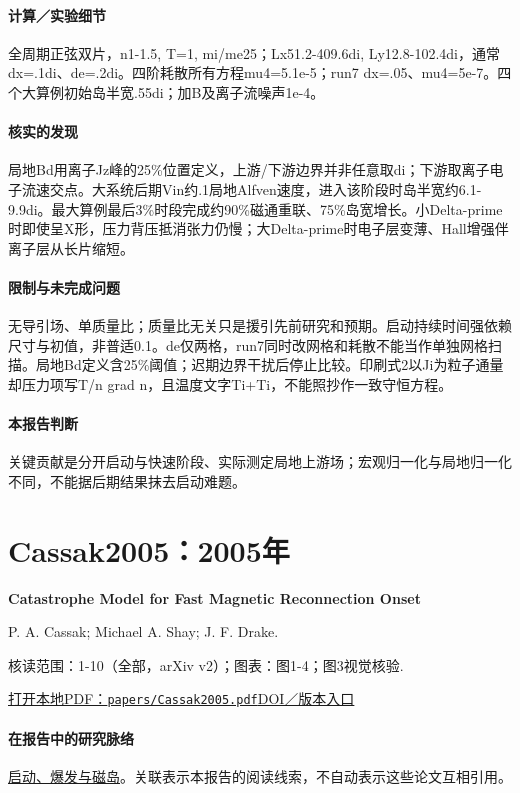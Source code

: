 \documentclass[UTF8,a4paper,11pt,openany,fontset=fandol]{ctexbook}
\begin{document}
\paragraph{计算／实验细节}全周期正弦双片，n1-1.5, T=1, mi/me25；Lx51.2-409.6di, Ly12.8-102.4di，通常dx=.1di、de=.2di。四阶耗散所有方程mu4=5.1e-5；run7 dx=.05、mu4=5e-7。四个大算例初始岛半宽.55di；加B及离子流噪声1e-4。

\paragraph{核实的发现}局地Bd用离子Jz峰的25\%位置定义，上游/下游边界并非任意取di；下游取离子电子流速交点。大系统后期Vin约.1局地Alfven速度，进入该阶段时岛半宽约6.1-9.9di。最大算例最后3\%时段完成约90\%磁通重联、75\%岛宽增长。小Delta-prime时即使呈X形，压力背压抵消张力仍慢；大Delta-prime时电子层变薄、Hall增强伴离子层从长片缩短。

\paragraph{限制与未完成问题}无导引场、单质量比；质量比无关只是援引先前研究和预期。启动持续时间强依赖尺寸与初值，非普适0.1。de仅两格，run7同时改网格和耗散不能当作单独网格扫描。局地Bd定义含25\%阈值；迟期边界干扰后停止比较。印刷式2以Ji为粒子通量却压力项写T/n grad n，且温度文字Ti+Ti，不能照抄作一致守恒方程。

\paragraph{本报告判断}关键贡献是分开启动与快速阶段、实际测定局地上游场；宏观归一化与局地归一化不同，不能据后期结果抹去启动难题。

\section{Cassak2005：2005年}\label{paper:Cassak2005}

\textbf{Catastrophe Model for Fast Magnetic Reconnection Onset}\citep{Cassak2005}\

P. A. Cassak;  Michael A. Shay;  J. F. Drake.

\textsf{核读范围：}1-10（全部，arXiv v2）；\textsf{图表：}图1-4；图3视觉核验.

\href{run:../papers/Cassak2005.pdf}{打开本地PDF：\texttt{papers/Cassak2005.pdf}}\quad\href{https://doi.org/10.1103/physrevlett.95.235002}{DOI／版本入口}

\paragraph{在报告中的研究脉络}\hyperref[story:onset]{启动、爆发与磁岛}。关联表示本报告的阅读线索，不自动表示这些论文互相引用。
\end{document}
